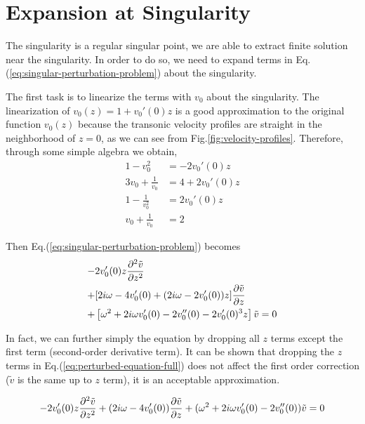 \section{Expansion at Singularity}
The singularity is a regular singular point, we are able to extract finite solution near the singularity. In order to do so, we need to expand terms in Eq.(\ref{eq:singular-perturbation-problem}) about the singularity.

The first task is to linearize the terms with $v_0$ about the singularity. The linearization of $v_0(z) = 1 + v_0'(0)z$ is a good approximation to the original function $v_0(z)$ because the transonic velocity profiles are straight in the neighborhood of $z=0$, as we can see from Fig.\ref{fig:velocity-profiles}. Therefore, through some simple algebra we obtain,
\begin{equation}
	\begin{aligned}
		1-v_0^2              & = -2v_0'(0)z    \\
		3v_0 + \frac{1}{v_0} & = 4 + 2v_0'(0)z \\
		1-\frac{1}{v_0^2}    & = 2v_0'(0)z     \\
		v_0 + \frac{1}{v_0}  & = 2
	\end{aligned}
\end{equation}

Then Eq.(\ref{eq:singular-perturbation-problem}) becomes
\begin{equation} \label{eq:perturbed-equation-full}
	\begin{aligned}
		- & 2v_0'(0)z\pdv[2]{\tilde{v}}{z}                                              \\
		+ & [2i\omega - 4v_0'(0) + (2i\omega - 2v_0'(0))z]\pdv{\tilde{v}}{z}            \\
		+ & \left[\omega^2 + 2i\omega v_0'(0) - 2v_0''(0) - 2v_0'(0)^3z\right]\tilde{v}
		= 0
	\end{aligned}
\end{equation}

In fact, we can further simply the equation by dropping all $z$ terms except the first term (second-order derivative term). It can be shown that dropping the $z$ terms in Eq.(\ref{eq:perturbed-equation-full}) does not affect the first order correction ($\tilde{v}$ is the same up to $z$ term), it is an acceptable approximation.

\[ - 2v_0'(0)z\pdv[2]{\tilde{v}}{z}
	+ (2i\omega - 4v_0'(0))\pdv{\tilde{v}}{z}
	+ (\omega^2 + 2i\omega v_0'(0) - 2v_0''(0))\tilde{v}
	= 0 \]

